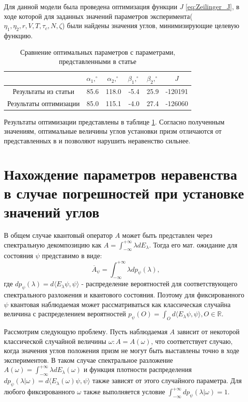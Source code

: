 \documentclass[%
master,         %
subf,           %
href,           %
,times         %
]{disser}
\numberwithin{equation}{section}
\numberwithin{figure}{section}
\begin{document}
Для данной модели была проведена оптимизация функции $J$ \eqref{eq:Zeilinger_J}, в ходе которой для заданных значений параметров эксперимента($\eta_1, \eta_2, r, V, T, \tau_c, N, \zeta$) были найдены значения углов, минимизирующие целевую функцию.

\begin{table}
\begin{tabular}{|c|c|c|c|c|c|}
\hline 
 & $\alpha_1, ^\circ$ & $\alpha_2, ^\circ$ & $\beta_1, ^\circ$ & $\beta_2, ^\circ$ & $J$ \\ 
\hline 
Результаты из статьи & 85.6 & 118.0 & -5.4 & 25.9 & -120191 \\ 
\hline 
Результаты оптимизации & 85.0 & 115.1 & -4.0 & 27.4 & -126060 \\ 
\hline 
\end{tabular}
\caption{Сравнение оптимальных параметров с параметрами, представленными в статье \cite{Zeilinger}}
\label{tab:Zeilinger_parameters}
\end{table}

Результаты оптимизации представлены в таблице \ref{tab:Zeilinger_parameters}. Согласно полученным значениям, оптимальные величины углов установки призм отличаются от представленных в \cite{Zeilinger} и позволяют нарушить неравенство сильнее.

\section{Нахождение параметров неравенства в случае погрешностей при установке значений углов}
В общем случае квантовый оператор $A$ может быть представлен через спектральную декомпозицию как $A = \int_{-\infty}^{+\infty}\lambda dE_\lambda$. Тогда его мат. ожидание для состояния $\psi$ представимо в виде:
\[
\overline{A}_\psi = \int_{-\infty}^{+\infty}\lambda dp_\psi (\lambda),
\]
где $dp_\psi (\lambda) = d\langle E_\lambda\psi, \psi\rangle$ - распределение вероятностей для соответствующего спектрального разложения и квантового состояния. Поэтому для фиксированного $\psi$ квантовая наблюдаемая может рассматриваться как классическая случайна величина с распределением вероятностей
$p_\psi (O) = \int_O d\langle E_\lambda\psi, \psi\rangle, O\in \mathbb{R}$.

Рассмотрим следующую проблему. Пусть наблюдаемая $A$ зависит от некоторой классической случайной величины $\omega: A = A(\omega)$, что соответствует случаю, когда значения углов положения призм не могут быть выставлены точно в ходе экспериментов. В таком случае спектральное разложение $A(\omega) = \int_{-\infty}^{+\infty}\lambda dE_\lambda(\omega)$ и функция плотности распределения $dp_\psi (\lambda|\omega) = d\langle E_\lambda(\omega)\psi, \psi\rangle$ также зависят от этого случайного параметра. Для любого фиксированного $\omega$ также выполняется условие $\int_{-\infty}^{+\infty}dp_\psi (\lambda|\omega) = 1$.
\end{document}
